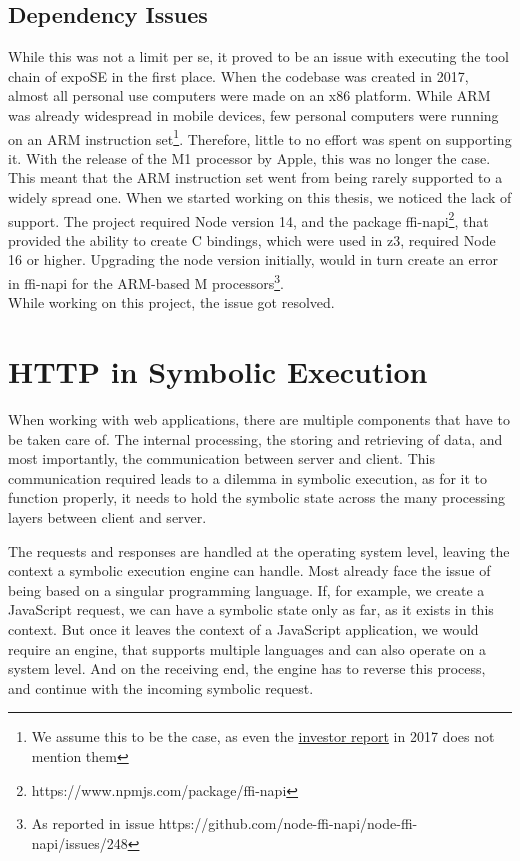 \subsection{Dependency Issues}
\label{sec:dep-issues}
While this was not a limit per se, it proved to be an issue with executing the tool chain of expoSE in the first place. When the codebase was created in 2017, almost all personal use computers were made on an x86 platform. While ARM was already widespread in mobile devices, few personal computers were running on an ARM instruction set\footnote{We assume this to be the case, as even the \href{https://www.arm.com/-/media/global/company/investors/Arm\%20Strategic\%20Review\%20-\%202017.pdf?revision=8473a535-6f7e-4ce5-85fe-0eb6f1f75487&la=en}{investor report} in 2017 does not mention them}. Therefore, little to no effort was spent on supporting it. 
With the release of the M1 processor by Apple, this was no longer the case.
This meant that the ARM instruction set went from being rarely supported to a widely spread one.
When we started working on this thesis, we noticed the lack of support. The project required Node version 14, and the package ffi-napi\footnote{https://www.npmjs.com/package/ffi-napi}, that provided the ability to create C bindings, which were used in z3, required Node 16 or higher.
Upgrading the node version initially, would in turn create an error in ffi-napi for the ARM-based M processors\footnote{As reported in issue https://github.com/node-ffi-napi/node-ffi-napi/issues/248}.\\
While working on this project, the issue got resolved.

\section{HTTP in Symbolic Execution}
\label{sec:http}
When working with web applications, there are multiple components that have to be taken care of. The internal processing, the storing and retrieving of data, and most importantly, the communication between server and client.
This communication required leads to a dilemma in symbolic execution, as for it to function properly, it needs to hold the symbolic state across the many processing layers between client and server. 


The requests and responses are handled at the operating system level, leaving the context a symbolic execution engine can handle. Most already face the issue of being based on a singular programming language. If, for example, we create a JavaScript request, we can have a symbolic state only as far, as it exists in this context. But once it leaves the context of a JavaScript application, we would require an engine, that supports multiple languages and can also operate on a system level.  And on the receiving end, the engine has to reverse this process, and continue with the incoming symbolic request.


